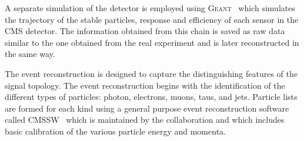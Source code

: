\documentclass[final,3p]{CSP}
\begin{document}

A separate simulation of the detector is employed using \textsc{Geant}~\cite{agostinelli2003geant4} which simulates the trajectory of the stable particles, response and efficiency of each sensor in the CMS detector.
The information obtained from this chain is saved as raw data similar to the one obtained from the real experiment and is later reconstructed in the same way.

The event reconstruction is designed to capture the distinguishing features of the signal topology.
The event reconstruction begins with the identification of the different types of particles: photon, electrons, muons, taus, and jets.
Particle lists are formed for each kind using a general purpose event reconstruction software called \textsc{CMSSW}~\cite{Bayatian:922757} which is maintained by the collaboration and which includes basic calibration of the various particle energy and momenta.
\end{document}
